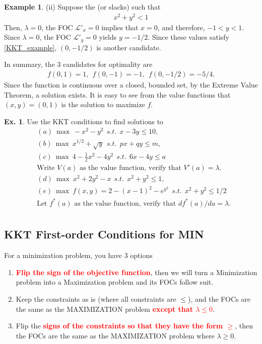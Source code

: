 \documentclass[10pt,a4paper]{book}
\newcommand{\red}[1]{\textcolor{red}{#1}}
\theoremstyle{definition}\newtheorem{definition}{Definition}
\theoremstyle{definition}\newtheorem{fact}{Fact}
\theoremstyle{definition}\newtheorem{ex}{Ex.}
\theoremstyle{definition}\newtheorem{project}{Project}
\theoremstyle{definition}\newtheorem{problem}{Problem}
\theoremstyle{definition}\newtheorem{example}{Example}
\numberwithin{theorem}{chapter}
\numberwithin{corollary}{chapter}
\numberwithin{assumption}{chapter}
\numberwithin{definition}{chapter}
\numberwithin{prop}{chapter}
\numberwithin{notation}{chapter}
\numberwithin{problem}{chapter}
\numberwithin{example}{chapter}
\numberwithin{fact}{chapter}
\numberwithin{ex}{chapter}
\begin{document}
\begin{example}
		(ii) Suppose the  (or slacks) such that
		\begin{align*}
			x^2 + y^2 < 1 
		\end{align*}
		Then, $\lambda = 0$, the FOC $\mathcal{L}'_x = 0$ implies that $x=0$, and therefore, $-1<y<1$. Since $\lambda=0$, the FOC $\mathcal{L}'_y = 0$ yields $y=-1/2$. Since these values satisfy \ref{KKT_example}, $(0,-1/2)$ is another candidate.
		
		In summary, the 3 candidates for optimality are
		\begin{align*}
			f(0,1) = 1, \ \ f(0,-1)= -1, \ \ f(0,-1/2) = -5/4. 
		\end{align*}
		Since the function is continuous over a closed, bounded set, by the Extreme Value Theorem, a solution exists. It is easy to see from the value functions that $(x,y) = (0,1)$ is the solution to maximize $f$.
	\end{example}
	
	\begin{ex}
		Use the KKT conditions to find solutions to
		\begin{align*}
			& (a) \ \max \ -x^2 - y^2 \ \ s.t. \ \ x - 3y \leq 10,                           \\
			& (b) \ \max \ x^{1/2} + \sqrt{y} \ \ s.t. \ \ px + qy \leq m,                   \\
			& (c) \ \max \ 4 - \frac{1}{2}x^2 - 4y^2 \ \ s.t. \ \ 6x - 4y \leq a               \\
			& \text{Write $V(a)$ as the value function, verify that $V'(a)=\lambda$.}        \\
			& (d) \ \max \ x^2 + 2y^2 - x \ \ s.t. \ \ x^2 + y^2 \leq 1,                     \\
			& (e) \ \max \ f(x,y) = 2 - (x-1)^2 - e^{y^2} \ \ s.t. \ \ x^2 + y^2 \leq 1/2    \\
			& \text{Let $f^*(a)$ as the value function, verify that $df^*(a)/da = \lambda$.} \\
		\end{align*}
	\end{ex}
	
	\subsection{KKT First-order Conditions for MIN}
	For a minimization problem, you have 3 options
	\begin{enumerate}
		\item \textbf{\red{Flip the sign of the objective function}}, then we will turn a Minimization problem into a Maximization problem and its FOCs follow suit.
		\item Keep the constraints as is (where all constraints are $\leq$), and the FOCs are the same as the MAXIMIZATION problem \textbf{\red{except that $\lambda \leq 0$}}.
		\item Flip the \textbf{\red{signs of the constraints so that they have the form $\geq$}}, then the FOCs are the same as the MAXIMIZATION problem where $\lambda \geq 0$.
	\end{enumerate}
	
\end{document}
